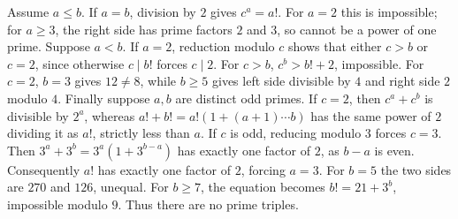 Assume $a\le b$. If $a=b$, division by $2$ gives $c^a=a!$. For $a=2$ this is impossible; for $a\ge3$, the right side has prime factors $2$ and $3$, so cannot be a power of one prime. Suppose $a<b$. If $a=2$, reduction modulo $c$ shows that either $c>b$ or $c=2$, since otherwise $c\mid b!$ forces $c\mid2$. For $c>b$, $c^b>b!+2$, impossible. For $c=2$, $b=3$ gives $12\ne8$, while $b\ge5$ gives left side divisible by $4$ and right side $2$ modulo $4$. Finally suppose $a,b$ are distinct odd primes. If $c=2$, then $c^a+c^b$ is divisible by $2^a$, whereas $a!+b!=a!(1+(a+1)\cdots b)$ has the same power of $2$ dividing it as $a!$, strictly less than $a$. If $c$ is odd, reducing modulo $3$ forces $c=3$. Then $3^a+3^b=3^a(1+3^{b-a})$ has exactly one factor of $2$, as $b-a$ is even. Consequently $a!$ has exactly one factor of $2$, forcing $a=3$. For $b=5$ the two sides are $270$ and $126$, unequal. For $b\ge7$, the equation becomes $b!=21+3^b$, impossible modulo $9$. Thus there are no prime triples.
